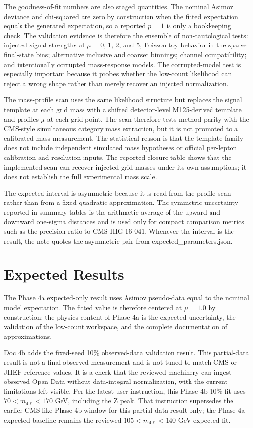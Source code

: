 \documentclass[11pt]{article}
\begin{document}
The goodness-of-fit numbers are also staged quantities. The nominal Asimov deviance and chi-squared are zero by construction when the fitted expectation equals the generated expectation, so a reported $p=1$ is only a bookkeeping check. The validation evidence is therefore the ensemble of non-tautological tests: injected signal strengths at $\mu=0$, 1, 2, and 5; Poisson toy behavior in the sparse final-state bins; alternative inclusive and coarser binnings; channel compatibility; and intentionally corrupted mass-response models. The corrupted-model test is especially important because it probes whether the low-count likelihood can reject a wrong shape rather than merely recover an injected normalization.

The mass-profile scan uses the same likelihood structure but replaces the signal template at each grid mass with a shifted detector-level M125-derived template and profiles $\mu$ at each grid point. The scan therefore tests method parity with the CMS-style simultaneous category mass extraction, but it is not promoted to a calibrated mass measurement. The statistical reason is that the template family does not include independent simulated mass hypotheses or official per-lepton calibration and resolution inputs. The reported closure table shows that the implemented scan can recover injected grid masses under its own assumptions; it does not establish the full experimental mass scale.

The expected interval is asymmetric because it is read from the profile scan rather than from a fixed quadratic approximation. The symmetric uncertainty reported in summary tables is the arithmetic average of the upward and downward one-sigma distances and is used only for compact comparison metrics such as the precision ratio to CMS-HIG-16-041. Whenever the interval is the result, the note quotes the asymmetric pair from expected\_parameters.json.
\section{Expected Results}
The Phase 4a expected-only result uses Asimov pseudo-data equal to the nominal model expectation. The fitted value is therefore centered at $\mu=1.0$ by construction; the physics content of Phase 4a is the expected uncertainty, the validation of the low-count workspace, and the complete documentation of approximations.

Doc 4b adds the fixed-seed 10\% observed-data validation result. This partial-data result is not a final observed measurement and is not tuned to match CMS or JHEP reference values. It is a check that the reviewed machinery can ingest observed Open Data without data-integral normalization, with the current limitations left visible. Per the latest user instruction, this Phase 4b 10\% fit uses $70 < m_{4\ell} < 170$ GeV, including the Z peak.
That instruction supersedes the earlier CMS-like Phase 4b window for this partial-data result only; the Phase 4a expected baseline remains the reviewed $105 < m_{4\ell} < 140$ GeV expected fit.
\end{document}
